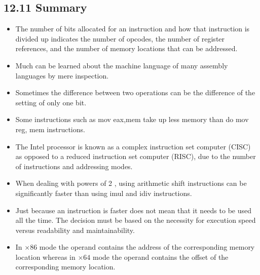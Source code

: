 \documentclass[10pt]{article}
\begin{document}
\subsection*{12.11 Summary}
\begin{itemize}
  \item The number of bits allocated for an instruction and how that instruction is divided up indicates the number of opcodes, the number of register references, and the number of memory locations that can be addressed.
  \item Much can be learned about the machine language of many assembly languages by mere inspection.
  \item Sometimes the difference between two operations can be the difference of the setting of only one bit.
  \item Some instructions such as mov eax,mem take up less memory than do mov reg, mem instructions.
  \item The Intel processor is known as a complex instruction set computer (CISC) as opposed to a reduced instruction set computer (RISC), due to the number of instructions and addressing modes.
  \item When dealing with powers of 2 , using arithmetic shift instructions can be significantly faster than using imul and idiv instructions.
  \item Just because an instruction is faster does not mean that it needs to be used all the time. The decision must be based on the necessity for execution speed versus readability and maintainability.
  \item In $\times 86$ mode the operand contains the address of the corresponding memory location whereas in $\times 64$ mode the operand contains the offset of the corresponding memory location.
\end{itemize}
\end{document}
